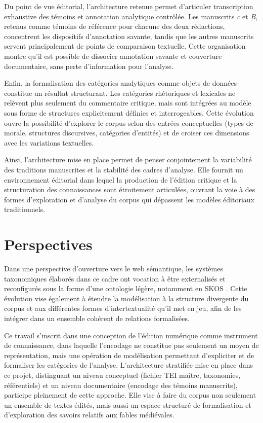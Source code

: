 \documentclass[final,fra]{anthology-ch}         %
\begin{document}
Du point de vue éditorial, l'architecture retenue permet d'articuler transcription exhaustive des témoins et annotation analytique contrôlée. Les manuscrits \emph{c} et \emph{B}, retenus comme témoins de référence pour chacune des deux rédactions, concentrent les dispositifs d'annotation savante, tandis que les autres manuscrits servent principalement de points de comparaison textuelle. Cette organisation montre qu'il est possible de dissocier annotation savante et couverture documentaire, sans perte d'information pour l'analyse.

Enfin, la formalisation des catégories analytiques comme objets de
données constitue un résultat structurant. Les catégories rhétoriques et lexicales ne relèvent plus seulement du commentaire critique, mais sont intégrées au modèle sous forme de structures explicitement définies et interrogeables. Cette évolution ouvre la possibilité d'explorer le corpus selon des entrées conceptuelles (types de morale, structures discursives, catégories d'entités) et de croiser ces dimensions avec les variations textuelles.

Ainsi, l'architecture mise en place permet de penser conjointement la
variabilité des traditions manuscrites et la stabilité des cadres
d'analyse.
Elle fournit un environnement éditorial dans
lequel la production de l'édition critique et la structuration des
connaissances sont étroitement articulées, ouvrant la voie à des formes
d'exploration et d'analyse du corpus qui dépassent les modèles
éditoriaux traditionnels.

\section{Perspectives}\label{perspectives}

Dans une perspective d'ouverture vers le web sémantique, les systèmes
taxonomiques élaborés dans ce cadre ont vocation à être externalisés et
reconfigurés sous la forme d'une ontologie légère, notamment en SKOS \cite{baker2013key}.
Cette évolution vise également à étendre la modélisation à la structure
divergente du corpus et aux différentes formes d'intertextualité qu'il
met en jeu, afin de les intégrer dans un ensemble cohérent de relations
formalisées.

Ce travail s'inscrit dans une conception de l'édition numérique comme
instrument de connaissance, dans laquelle l'encodage ne constitue pas
seulement un moyen de représentation, mais une opération de modélisation
permettant d'expliciter et de formaliser les catégories de l'analyse.
L'architecture stratifiée mise en place dans ce projet, distinguant un
niveau conceptuel (fichier TEI maître, taxonomies, référentiels) et un
niveau documentaire (encodage des témoins manuscrits), participe
pleinement de cette approche.
Elle vise à faire du corpus non seulement
un ensemble de textes édités, mais aussi un espace structuré de
formalisation et d'exploration des savoirs relatifs aux fables
médiévales.
\end{document}
